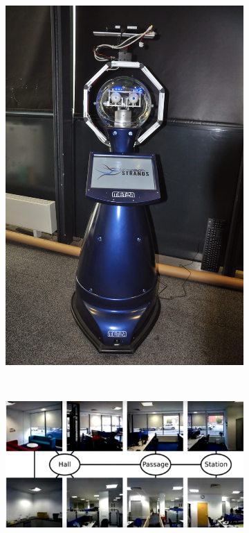 \begin{figure}
    \centering
    \begin{subfigure}[b]{0.21\textwidth}
        \includegraphics[width=\textwidth]{images/scitos.jpg}
        \caption{}
        \label{fig:scitos}
    \end{subfigure}
    ~ %
    \begin{subfigure}[b]{0.6\textwidth}
        \includegraphics[width=\textwidth]{images/kth-dataset-2.png}

\end{subfigure}
\end{figure}
